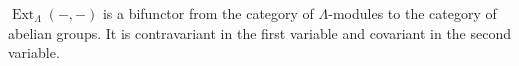 $\operatorname{Ext}_{\Lambda}(-, -)$ is a bifunctor from the category of $\Lambda$-modules to the category of abelian groups. It is contravariant in the first variable and covariant in the second variable.
